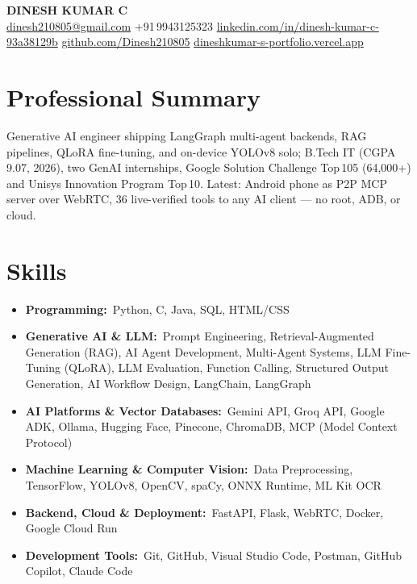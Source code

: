 \documentclass[8pt, a4paper]{article}
\begin{document}
\begin{center}
  {\large\bfseries DINESH KUMAR C}\\[2pt]
  {\small
    \href{mailto:dinesh210805@gmail.com}{dinesh210805@gmail.com}\enspace\textbar\enspace
    +91\,9943125323\enspace\textbar\enspace
    \href{https://linkedin.com/in/dinesh-kumar-c-93a38129b}{linkedin.com/in/dinesh-kumar-c-93a38129b}\enspace\textbar\enspace
    \href{https://github.com/Dinesh210805}{github.com/Dinesh210805}\enspace\textbar\enspace
    \href{https://dineshkumar-s-portfolio.vercel.app}{dineshkumar-s-portfolio.vercel.app}
  }
\end{center}
\section{Professional Summary}
{\small\noindent
Generative AI engineer shipping LangGraph multi-agent backends, RAG pipelines, QLoRA fine-tuning, and on-device YOLOv8 solo; B.Tech IT (CGPA\,9.07, 2026), two GenAI internships, Google Solution Challenge Top\,105 (64,000+) and Unisys Innovation Program Top\,10. Latest: Android phone as P2P MCP server over WebRTC, 36 live-verified tools to any AI client --- no root, ADB, or cloud.
}
\section{Skills}
{\footnotesize
\begin{itemize}[topsep=0.8pt, itemsep=0.4pt]

  \item \textbf{Programming:}~Python, C, Java, SQL, HTML/CSS

  \item \textbf{Generative AI \& LLM:}~Prompt Engineering, Retrieval-Augmented Generation (RAG),
  AI Agent Development, Multi-Agent Systems, LLM Fine-Tuning (QLoRA),
  LLM Evaluation, Function Calling, Structured Output Generation,
  AI Workflow Design, LangChain, LangGraph

  \item \textbf{AI Platforms \& Vector Databases:}~Gemini API, Groq API,
  Google ADK, Ollama, Hugging Face, Pinecone, ChromaDB,
  MCP (Model Context Protocol)

  \item \textbf{Machine Learning \& Computer Vision:}~Data Preprocessing,
  TensorFlow, YOLOv8, OpenCV, spaCy, ONNX Runtime, ML Kit OCR

  \item \textbf{Backend, Cloud \& Deployment:}~FastAPI, Flask,
  WebRTC, Docker, Google Cloud Run

  \item \textbf{Development Tools:}~Git, GitHub, Visual Studio Code,
  Postman, GitHub Copilot, Claude Code

\end{itemize}
}
\end{document}
